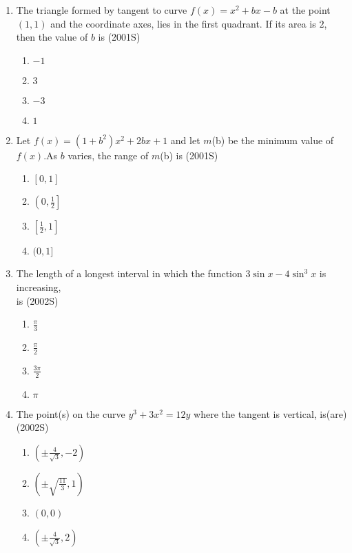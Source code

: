 \documentclass[journal,12pt,twocolumn]{IEEEtran}
\theoremstyle{remark}
\begin{document}
\begin{enumerate}[start=9]
\item The triangle formed by tangent to curve $f(x)=x^2+bx-b$ at the point $(1,1)$ and the coordinate axes, lies in the first quadrant. If its area is $2$, then the value of $b$ is 
\hfill {(2001S)}
\begin{enumerate}
    \item $-1$
    \item $3$ 
    \item $-3$
    \item $1$\\
\end{enumerate}
\item Let $f(x)=(1+b^2)x^2+2bx+1$ and let $m$(b) be the minimum value of $f(x)$.As $b$ varies, the range of $m$(b) is 
\hfill {(2001S)}
\begin{enumerate}
    \item $[0,1]$\\
    \item $\left(0,\displaystyle\frac{1}{2}\right]$\\
    \item $\left[\displaystyle\frac{1}{2},1\right]$\\
    \item $(0,1]$\\
\end{enumerate}
\item The length of a longest interval in which the function $3 \sin x-4\sin^3x$ is increasing,\\
is \hfill {(2002S)}
\begin{enumerate}
    \item $\displaystyle\frac{\pi}{3}$\\
    \item $\displaystyle\frac{\pi}{2}$\\
    \item $\displaystyle\frac{3\pi}{2}$\\
    \item $\pi$
\end{enumerate}
\item The point(s) on the curve $y^3+3x^2=12y$ where the tangent is vertical, is(are)
\hfill {(2002S)}\\
\begin{enumerate}
    \item $\left(\pm \displaystyle\frac{4}{\sqrt{3}},-2\right)$\\
    \item $\left(\pm\sqrt{\displaystyle\frac{11}{3}},1\right)$\\
    \item $(0,0)$\\
    \item $\left(\pm \displaystyle\frac{4}{\sqrt{3}},2\right)$\\\\
\end{enumerate}


\end{enumerate}
\end{document}
